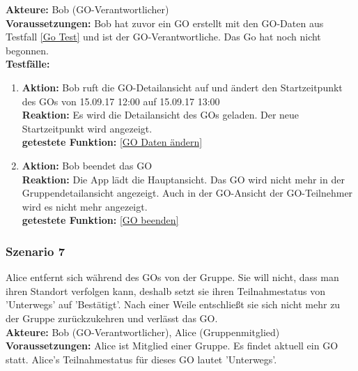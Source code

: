 \documentclass[parskip=full]{scrartcl}
\def\threedigits#1{%
  \ifnum#1<100 0\fi
  \ifnum#1<10 0\fi
  \number#1}
\begin{document}
\textbf{Akteure:} Bob (GO-Verantwortlicher)\\

\textbf{Voraussetzungen: }Bob hat zuvor ein GO erstellt mit den GO-Daten aus Testfall \ref{Go Test} und ist der GO-Verantwortliche. Das Go hat noch nicht begonnen.\\

\textbf{Testfälle:}
\begin{enumerate}[label={\textbf{/T\protect\threedigits{\theenumi}0/}}, leftmargin=*, resume]
	\item \textbf{Aktion:} Bob ruft die GO-Detailansicht auf und ändert den Startzeitpunkt des GOs von 15.09.17 12:00 auf 15.09.17 13:00\\
	\textbf{Reaktion:} Es wird die Detailansicht des GOs geladen. Der neue Startzeitpunkt wird angezeigt.\\
	\textbf{getestete Funktion:} \ref{GO Daten ändern}
	\item \textbf{Aktion:} Bob beendet das GO\\
	\textbf{Reaktion:} Die App lädt die Hauptansicht. Das GO wird nicht mehr in der Gruppendetailansicht angezeigt. Auch in der GO-Ansicht der GO-Teilnehmer wird es nicht mehr angezeigt.\\
	\textbf{getestete Funktion:} \ref{GO beenden}
\end{enumerate}

\subsubsection*{Szenario 7}Alice entfernt sich während des GOs von der Gruppe. Sie will nicht, dass man ihren Standort verfolgen kann, deshalb setzt sie ihren Teilnahmestatus von 'Unterwegs' auf 'Bestätigt'. Nach einer Weile entschließt sie sich nicht mehr zu der Gruppe zurückzukehren und verlässt das GO.\\

\textbf{Akteure:} Bob (GO-Verantwortlicher), Alice (Gruppenmitglied)\\

\textbf{Voraussetzungen: }Alice ist Mitglied einer Gruppe. Es findet aktuell ein GO statt. Alice's Teilnahmestatus für dieses GO lautet 'Unterwegs'.\\
\end{document}
